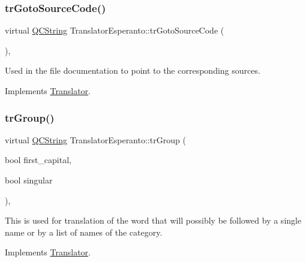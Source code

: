 \mbox{\label{class_translator_esperanto_a6ad2d4886f628b6b7c521243e0cf858c}} 
\subsubsection{\texorpdfstring{trGotoSourceCode()}{trGotoSourceCode()}}
{\footnotesize\ttfamily virtual \mbox{\hyperlink{class_q_c_string}{Q\+C\+String}} Translator\+Esperanto\+::tr\+Goto\+Source\+Code (\begin{DoxyParamCaption}{ }\end{DoxyParamCaption})\hspace{0.3cm}{\ttfamily [inline]}, {\ttfamily [virtual]}}

Used in the file documentation to point to the corresponding sources. 

Implements \mbox{\hyperlink{class_translator}{Translator}}.

\mbox{\label{class_translator_esperanto_ac4b9a81e483496deda1e696121caf83d}} 
\subsubsection{\texorpdfstring{trGroup()}{trGroup()}}
{\footnotesize\ttfamily virtual \mbox{\hyperlink{class_q_c_string}{Q\+C\+String}} Translator\+Esperanto\+::tr\+Group (\begin{DoxyParamCaption}\item[{bool}]{first\+\_\+capital,  }\item[{bool}]{singular }\end{DoxyParamCaption})\hspace{0.3cm}{\ttfamily [inline]}, {\ttfamily [virtual]}}

This is used for translation of the word that will possibly be followed by a single name or by a list of names of the category. 

Implements \mbox{\hyperlink{class_translator}{Translator}}.

\mbox{\label{class_translator_esperanto_a83b46757b333f7ac4353f0d9296f7c4b}} 
